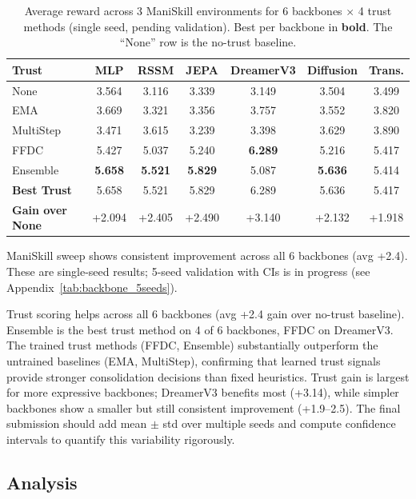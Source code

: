 \documentclass{article}
\begin{document}
\begin{table}[h]
\centering
\caption{Average reward across 3 ManiSkill environments for 6 backbones $\times$ 4 trust methods (single seed, pending validation). Best per backbone in \textbf{bold}. The ``None'' row is the no-trust baseline.}
\label{tab:backbone_invariance}
\small
\begin{tabular}{lcccccc}
\toprule
Trust & MLP & RSSM & JEPA & DreamerV3 & Diffusion & Trans. \\
\midrule
None & 3.564 & 3.116 & 3.339 & 3.149 & 3.504 & 3.499 \\
EMA & 3.669 & 3.321 & 3.356 & 3.757 & 3.552 & 3.820 \\
MultiStep & 3.471 & 3.615 & 3.239 & 3.398 & 3.629 & 3.890 \\
FFDC & 5.427 & 5.037 & 5.240 & \textbf{6.289} & 5.216 & 5.417 \\
Ensemble & \textbf{5.658} & \textbf{5.521} & \textbf{5.829} & 5.087 & \textbf{5.636} & 5.414 \\
\midrule
\textbf{Best Trust} & 5.658 & 5.521 & 5.829 & 6.289 & 5.636 & 5.417 \\
\textbf{Gain over None} & +2.094 & +2.405 & +2.490 & +3.140 & +2.132 & +1.918 \\
\bottomrule
\end{tabular}
\end{table}

ManiSkill sweep shows consistent improvement across all 6 backbones (avg +2.4). These are single-seed results; 5-seed validation with CIs is in progress (see Appendix~\ref{tab:backbone_5seeds}).

Trust scoring helps across all 6 backbones (avg +2.4 gain over no-trust baseline). Ensemble is the best trust method on 4 of 6 backbones, FFDC on DreamerV3. The trained trust methods (FFDC, Ensemble) substantially outperform the untrained baselines (EMA, MultiStep), confirming that learned trust signals provide stronger consolidation decisions than fixed heuristics. Trust gain is largest for more expressive backbones; DreamerV3 benefits most (+3.14), while simpler backbones show a smaller but still consistent improvement (+1.9--2.5). The final submission should add mean $\pm$ std over multiple seeds and compute confidence intervals to quantify this variability rigorously.

\subsection{Analysis}
\end{document}
